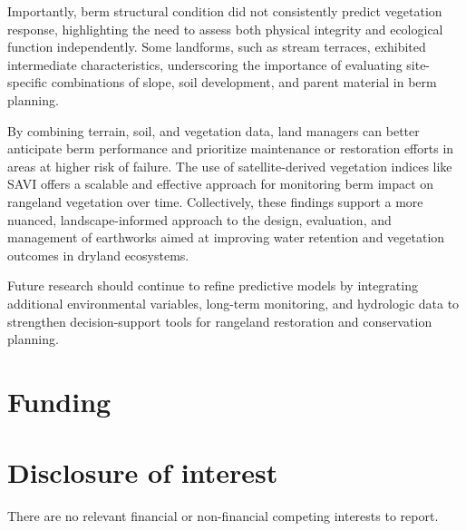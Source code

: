 \documentclass[review]{elsarticle}
\begin{document}
Importantly, berm structural condition did not consistently predict vegetation response, highlighting the need to assess both physical integrity and ecological function independently. Some landforms, such as stream terraces, exhibited intermediate characteristics, underscoring the importance of evaluating site-specific combinations of slope, soil development, and parent material in berm planning.

By combining terrain, soil, and vegetation data, land managers can better anticipate berm performance and prioritize maintenance or restoration efforts in areas at higher risk of failure. The use of satellite-derived vegetation indices like SAVI offers a scalable and effective approach for monitoring berm impact on rangeland vegetation over time. Collectively, these findings support a more nuanced, landscape-informed approach to the design, evaluation, and management of earthworks aimed at improving water retention and vegetation outcomes in dryland ecosystems.

Future research should continue to refine predictive models by integrating additional environmental variables, long-term monitoring, and hydrologic data to strengthen decision-support tools for rangeland restoration and conservation planning.

\section*{Funding}

 

\section*{Disclosure of interest}

There are no relevant financial or non-financial competing interests to report.



\end{document}
